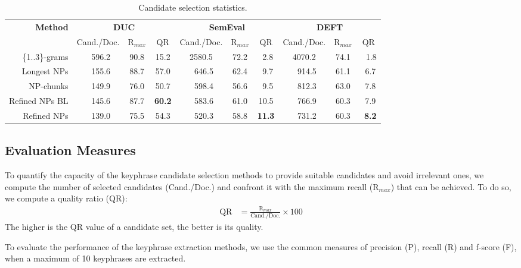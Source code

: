  \begin{table*}
    \centering
    \begin{tabular}{@{}r@{~~}c@{~}c@{~~}c@{~}c@{~}c@{~~}c@{~}c@{~}c@{~~}c@{}}
      \toprule
      \multirow{2}{*}[-2pt]{\textbf{Method}} & \multicolumn{3}{c}{\textbf{DUC}} & \multicolumn{3}{c}{\textbf{SemEval}} & \multicolumn{3}{c}{\textbf{DEFT}}\\
      \cmidrule(r){2-4}\cmidrule(r){5-7}\cmidrule{8-10}
      & Cand./Doc. & R$_{max}$ & QR & Cand./Doc. & R$_{max}$ & QR & Cand./Doc. & R$_{max}$ & QR\\
      \midrule
      \{1..3\}-grams & $~~~$596.2 & 90.8 & 15.2 & 2580.5 & 72.2 & $~~$2.8 & 4070.2 & 74.1 & $~~~$1.8\\
      Longest NPs & $~~~$155.6 & 88.7 & 57.0 & $~~~$646.5 & 62.4 & $~~$9.7 & $~~~$914.5 & 61.1 & $~~$6.7\\
      NP-chunks & $~~~$149.9 & 76.0 & 50.7 & $~~~$598.4 & 56.6 & $~~$9.5 & $~~~$812.3 & 63.0 & $~~$7.8\\
      Refined NPs BL & $~~~$145.6 & 87.7 & \textbf{60.2} & $~~~$583.6 & 61.0 & 10.5 & $~~~$766.9 & 60.3 & $~~$7.9\\
      Refined NPs & $~~~$139.0 & 75.5 & 54.3 & $~~~$520.3 & 58.8 & \textbf{11.3} & $~~~$731.2 & 60.3 & \textbf{$~~$8.2}\\
      \bottomrule
    \end{tabular}
    \caption{Candidate selection statistics.
             \label{tab:candidate_extraction_statistics}}
  \end{table*}

  \subsection{Evaluation Measures}
  \label{subsec:keyphrase_extraction_evaluation_measures}
    To quantify the capacity of the keyphrase candidate selection methods to
    provide suitable candidates and avoid irrelevant ones, we compute the
    number of selected candidates (Cand./Doc.) and confront it with the
    maximum recall (R$_{max}$) that can be achieved. To do so, we compute a
    quality ratio (QR):
    \begin{align}
      \text{QR} &= \frac{\text{R$_{max}$}}{\text{Cand./Doc.}} \times 100
    \end{align}
    The higher is the QR value of a candidate set, the better is its quality.

    To evaluate the performance of the keyphrase extraction methods, we use
    the common measures of precision (P), recall (R) and f-score (F), when a
    maximum of 10 keyphrases are extracted.

